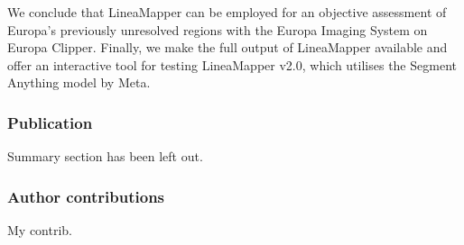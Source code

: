 We conclude that LineaMapper can be employed for an objective assessment of Europa's previously unresolved regions with the Europa Imaging System on Europa Clipper. Finally, we make the full output of LineaMapper available and offer an interactive tool for testing LineaMapper v2.0, which utilises the Segment Anything model by Meta.

\subsubsection{Publication}Summary section has been left out.

\subsubsection{Author contributions}My contrib.




% 

